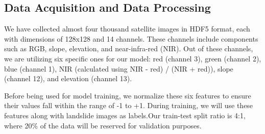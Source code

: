 \documentclass[12pt,a4paper]{report}
\begin{document}
\vspace{1cm}
\begin{center}



\end{center}

\vspace{1cm}

		\label{Data Acquisition and Data Processing}
		\subsection{Data Acquisition and Data Processing}	We have collected almost four thousand satellite images in HDF5 format, each with dimensions of 128x128 and 14 channels. These channels include components such as RGB, slope, elevation, and near-infra-red (NIR). Out of these channels, we are utilizing six specific ones for our model: red (channel 3), green (channel 2), blue (channel 1), NIR (calculated using NIR - red) / (NIR + red)), slope (channel 12), and elevation (channel 13).

Before being used for model training, we normalize these six features to ensure their values fall within the range of -1 to +1. During training, we will use these features along with landslide images as labels.Our train-test split ratio is 4:1, where 20\% of the data will be reserved for validation purposes.\cite{gsch} 
	\\ \\
\end{document}
